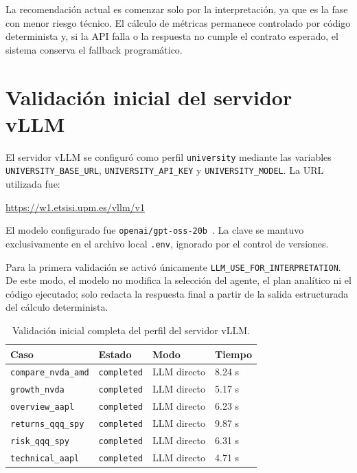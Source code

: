 La recomendación actual es comenzar solo por la interpretación, ya que es la fase con menor riesgo técnico. El cálculo de métricas permanece controlado por código determinista y, si la API falla o la respuesta no cumple el contrato esperado, el sistema conserva el fallback programático.

\section{Validación inicial del servidor vLLM}

El servidor vLLM se configuró como perfil \texttt{university} mediante las variables \texttt{UNIVERSITY\_BASE\_URL}, \texttt{UNIVERSITY\_API\_KEY} y \texttt{UNIVERSITY\_MODEL}. La URL utilizada fue:

\begin{center}
\url{https://w1.etsisi.upm.es/vllm/v1}
\end{center}

El modelo configurado fue \texttt{openai/gpt-oss-20b}~\cite{openai2025gptossmodelcard}. La clave se mantuvo exclusivamente en el archivo local \texttt{.env}, ignorado por el control de versiones.

Para la primera validación se activó únicamente \texttt{LLM\_USE\_FOR\_INTERPRETATION}. De este modo, el modelo no modifica la selección del agente, el plan analítico ni el código ejecutado; solo redacta la respuesta final a partir de la salida estructurada del cálculo determinista.

\begin{table}[h]
\centering
\begin{tabular}{llll}
\toprule
\textbf{Caso} & \textbf{Estado} & \textbf{Modo} & \textbf{Tiempo} \\
\midrule
\texttt{compare\_nvda\_amd} & \texttt{completed} & LLM directo & 8.24 s \\
\texttt{growth\_nvda} & \texttt{completed} & LLM directo & 5.17 s \\
\texttt{overview\_aapl} & \texttt{completed} & LLM directo & 6.23 s \\
\texttt{returns\_qqq\_spy} & \texttt{completed} & LLM directo & 9.87 s \\
\texttt{risk\_qqq\_spy} & \texttt{completed} & LLM directo & 6.31 s \\
\texttt{technical\_aapl} & \texttt{completed} & LLM directo & 4.71 s \\
\bottomrule
\end{tabular}
\caption{Validación inicial completa del perfil del servidor vLLM.}
\end{table}

